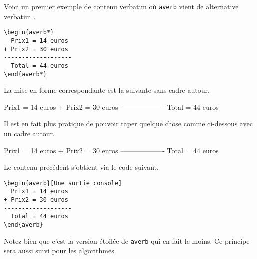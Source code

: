 Voici un premier exemple de contenu verbatim où \verb+averb+ vient de \og alternative verbatim \fg. 

\begin{frame-gene}
	\small
	\begin{verbatim}
\begin{averb*}
  Prix1 = 14 euros
+ Prix2 = 30 euros
-------------------
  Total = 44 euros
\end{averb*} 
	\end{verbatim}
\end{frame-gene}


La mise en forme correspondante est la suivante sans cadre autour.

\begin{frame-gene}
	\begin{averb*}
  Prix1 = 14 euros
+ Prix2 = 30 euros
-------------------
  Total = 44 euros
	\end{averb*} 
\end{frame-gene}


\medskip


Il est en fait plus pratique de pouvoir taper quelque chose comme ci-dessous avec un cadre autour.

\begin{averb}
  Prix1 = 14 euros
+ Prix2 = 30 euros
-------------------
  Total = 44 euros
\end{averb} 


Le contenu précédent s'obtient via le code suivant.

\begin{frame-gene}
	\small
	\begin{verbatim}
\begin{averb}[Une sortie console]
  Prix1 = 14 euros
+ Prix2 = 30 euros
-------------------
  Total = 44 euros
\end{averb} 
	\end{verbatim} 
\end{frame-gene}


\medskip

Notez bien que c'est la version étoilée de \verb+averb+ qui en fait le moins. Ce principe sera aussi suivi pour les algorithmes.

\vfill
\null
